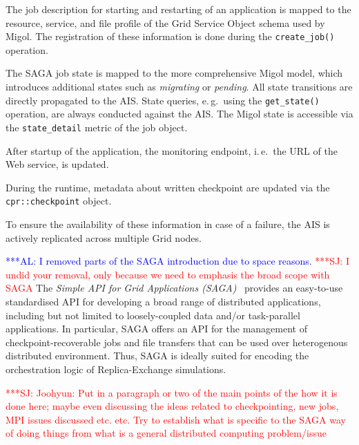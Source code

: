 \documentclass[conference,final]{IEEEtran}
\newcommand{\alnote}[1]{ {\textcolor{blue} { ***AL: #1 }}}
\newcommand{\jhanote}[1]{ {\textcolor{red} { ***SJ: #1 }}}
\newcommand{\alnote}[1]{}
\newcommand{\jhanote}[1]{}
\newcommand{\up}{\vspace*{-1em}}
\begin{document}
\begin{compactitem}
\item The job description for starting and restarting of an
  application is mapped to the resource, service, and file profile of
  the Grid Service Object schema used by Migol. The registration of
  these information is done during the \texttt{create\_job()}
  operation.
\item The SAGA job state is mapped to the more comprehensive Migol
  model, which introduces additional states such as \emph{migrating}
  or \emph{pending}. All state transitions are directly propagated to
  the AIS. State queries, e.\,g.\ using the \texttt{get\_state()}
  operation, are always conducted against the AIS. The Migol state is
  accessible via the \texttt{state\_detail} metric of the job object.
\item After startup of the application, the monitoring endpoint,
  i.\,e.\ the URL of the Web service, is updated.
\item During the runtime, metadata about written checkpoint are 
  updated via the \texttt{cpr::checkpoint} object.
\end{compactitem}   
To ensure the availability of these information in case of a failure,
the AIS is actively replicated across multiple Grid nodes.


\up
{}

\up \alnote{I removed parts of the SAGA introduction due to space
  reasons.}  \jhanote{I undid your removal, only because we need to
  emphasis the broad scope with SAGA} The \emph{Simple API for Grid
  Applications (SAGA)}~\cite{saga_gfd90} provides an easy-to-use
standardised API for developing a broad range of distributed
applications, including but not limited to loosely-coupled data and/or
task-parallel applications.  %
In particular, SAGA offers an API for the management of
checkpoint-recoverable jobs and file transfers that can be used over
heterogenous distributed environment. Thus, SAGA is ideally suited for
encoding the orchestration logic of Replica-Exchange simulations.

\jhanote{Joohyun: Put in a paragraph or two of the main points of the
  how it is done here; maybe even discussing the ideas related to
  checkpointing, new jobs, MPI issues discussed etc. etc. Try to
  establish what is specific to the SAGA way of doing things from what
  is a general distributed computing problem/issue}
\end{document}

